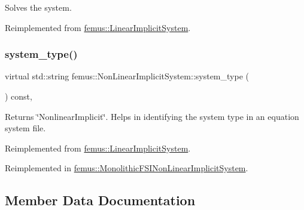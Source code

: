 Solves the system. 

Reimplemented from \mbox{\hyperlink{classfemus_1_1_linear_implicit_system_ab37c3204960b888a594fb38e0803d2e5}{femus\+::\+Linear\+Implicit\+System}}.

\mbox{\label{classfemus_1_1_non_linear_implicit_system_a8f4727b8b763bdac9f58b4c9dbb097be}} 
\subsubsection{\texorpdfstring{system\+\_\+type()}{system\_type()}}
{\footnotesize\ttfamily virtual std\+::string femus\+::\+Non\+Linear\+Implicit\+System\+::system\+\_\+type (\begin{DoxyParamCaption}{ }\end{DoxyParamCaption}) const\hspace{0.3cm}{\ttfamily [inline]}, {\ttfamily [virtual]}}

\begin{DoxyReturn}{Returns}
{\ttfamily \char`\"{}\+Nonlinear\+Implicit\char`\"{}}. Helps in identifying the system type in an equation system file. 
\end{DoxyReturn}


Reimplemented from \mbox{\hyperlink{classfemus_1_1_linear_implicit_system_a45df3966aab87bd06da49c78897a6648}{femus\+::\+Linear\+Implicit\+System}}.



Reimplemented in \mbox{\hyperlink{classfemus_1_1_monolithic_f_s_i_non_linear_implicit_system_a29bb0bdaf1eec888af05e8e57469faf4}{femus\+::\+Monolithic\+F\+S\+I\+Non\+Linear\+Implicit\+System}}.



\subsection{Member Data Documentation}
\mbox{\label{classfemus_1_1_non_linear_implicit_system_ab5c78ff5fc515d2ebe4cd3fb0c931cb0}} 
